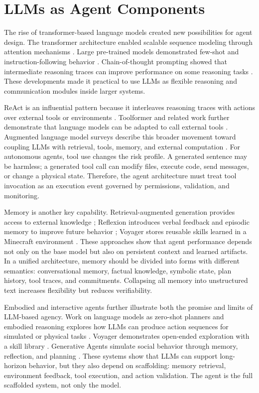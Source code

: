 \section{LLMs as Agent Components}

The rise of transformer-based language models created new possibilities for agent design. The transformer architecture enabled scalable sequence modeling through attention mechanisms \cite{vaswani2017attention}. Large pre-trained models demonstrated few-shot and instruction-following behavior \cite{brown2020language,ouyang2022training}. Chain-of-thought prompting showed that intermediate reasoning traces can improve performance on some reasoning tasks \cite{wei2022chain}. These developments made it practical to use LLMs as flexible reasoning and communication modules inside larger systems.

ReAct is an influential pattern because it interleaves reasoning traces with actions over external tools or environments \cite{yao2023react}. Toolformer and related work further demonstrate that language models can be adapted to call external tools \cite{schick2023toolformer}. Augmented language model surveys describe this broader movement toward coupling LLMs with retrieval, tools, memory, and external computation \cite{mialon2023augmented}. For autonomous agents, tool use changes the risk profile. A generated sentence may be harmless; a generated tool call can modify files, execute code, send messages, or change a physical state. Therefore, the agent architecture must treat tool invocation as an execution event governed by permissions, validation, and monitoring.

Memory is another key capability. Retrieval-augmented generation provides access to external knowledge \cite{lewis2020retrieval}; Reflexion introduces verbal feedback and episodic memory to improve future behavior \cite{shinn2023reflexion}; Voyager stores reusable skills learned in a Minecraft environment \cite{wang2023voyager}. These approaches show that agent performance depends not only on the base model but also on persistent context and learned artifacts. In a unified architecture, memory should be divided into forms with different semantics: conversational memory, factual knowledge, symbolic state, plan history, tool traces, and commitments. Collapsing all memory into unstructured text increases flexibility but reduces verifiability.

Embodied and interactive agents further illustrate both the promise and limits of LLM-based agency. Work on language models as zero-shot planners and embodied reasoning explores how LLMs can produce action sequences for simulated or physical tasks \cite{huang2022language,huang2022inner}. Voyager demonstrates open-ended exploration with a skill library \cite{wang2023voyager}. Generative Agents simulate social behavior through memory, reflection, and planning \cite{park2023generative}. These systems show that LLMs can support long-horizon behavior, but they also depend on scaffolding: memory retrieval, environment feedback, tool execution, and action validation. The agent is the full scaffolded system, not only the model.

